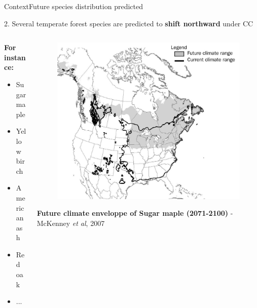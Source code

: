 \documentclass[10pt,aspectratio=149]{beamer}
\begin{document}
\begin{frame}{Context}{Future species distribution predicted}

2. Several temperate forest species are predicted to \textbf{shift northward} under CC
\begin{columns}[c]
	\begin{column}{.40\paperwidth}
	\textbf{For instance:}
		\begin{itemize}
			\item Sugar maple
			\item Yellow birch
			\item American ash
			\item Red oak
			\item ...
		\end{itemize}
	\end{column}
	\begin{column}{.40\paperwidth}
	\pause
		\begin{figure}
			\includegraphics[width=.38\paperwidth]{Figs/sugar_map_distrib.jpg}
		\end{figure}
	\scriptsize{\textbf{Future climate enveloppe of Sugar maple (2071-2100)} - McKenney \textit{et al}, 2007}
	\end{column}
\end{columns}
\end{frame}
\end{document}
